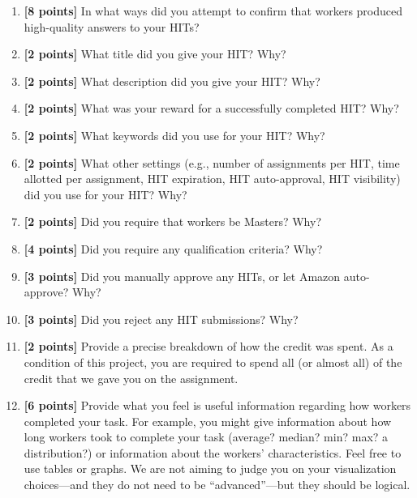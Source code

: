 \documentclass{article}
\begin{document}
\begin{enumerate}
    \item \textbf{[8 points]} In what ways did you attempt to confirm that workers produced high-quality answers to your HITs? 
    
    \item \textbf{[2 points]} What title did you give your HIT? Why?

    \item \textbf{[2 points]} What description did you give your HIT? Why?

    \item \textbf{[2 points]} What was your reward for a successfully completed HIT? Why?

    \item \textbf{[2 points]} What keywords did you use for your HIT? Why?

    \item \textbf{[2 points]} What other settings (e.g., number of assignments per HIT, time allotted per assignment, HIT expiration, HIT auto-approval, HIT visibility) did you use for your HIT? Why?

    \item \textbf{[2 points]} Did you require that workers be Masters? Why?
     
    \item \textbf{[4 points]} Did you require any qualification criteria? Why?

     \item \textbf{[3 points]} Did you manually approve any HITs, or let Amazon auto-approve? Why?

     \item \textbf{[3 points]} Did you reject any HIT submissions? Why?

     \item \textbf{[2 points]} Provide a precise breakdown of how the credit was spent. As a condition of this project, you are required to spend all (or almost all) of the credit that we gave you on the assignment.

     \item \textbf{[6 points]} Provide what you feel is useful information regarding how workers completed your task. For example, you might give information about how long workers took to complete your task (average? median? min? max? a distribution?) or information about the workers' characteristics. Feel free to use tables or graphs. We are not aiming to judge you on your visualization choices---and they do not need to be ``advanced''---but they should be logical.
     

\end{enumerate}
\end{document}
